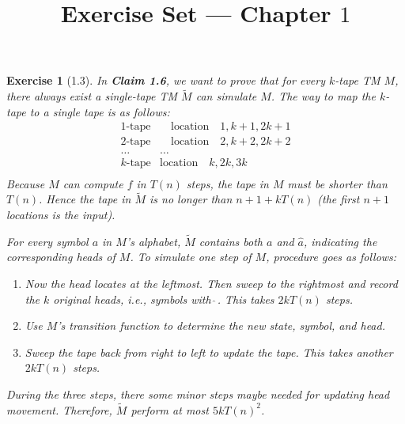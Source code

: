 \documentclass[a4paper]{article}
\title{Exercise Set --- Chapter $1$}
\date{}
\newtheorem*{exercise}{Exercise}
\begin{document}
\maketitle

\begin{exercise}[1.3]
	In \textbf{Claim 1.6}, we want to prove that for every $k$-tape TM $M$,
    there always exist a single-tape TM $\widetilde{M}$ can simulate $M$.
    The way to map the $k$-tape to a single tape is as follows:
		$$
        \begin{matrix}		
            1\text{-tape}&\quad \text{location}\quad 1, k+1, 2k+1\\			
             2\text{-tape}&\quad \text{location}\quad 2, k+2, 2k+2\\			
			 \dots&\dots\\			
             k\text{-tape}&\text{location}\quad k, 2k, 3k\\			
		\end{matrix}
        $$
	Because $M$ can compute $f$ in $T(n)$ steps, the tape in $M$ must be shorter than $T(n)$.
    Hence the tape in $\widetilde{M}$ is no longer than $n+1+kT(n)$ (the first $n+1$ locations is the input).

	For every symbol $a$ in $M$'s alphabet, $\widetilde{M}$ contains both $a$ and $\widehat{a}$, 
    indicating the corresponding heads of $M$. 
	To simulate one step of $M$, procedure goes as follows:
    \begin{enumerate}
        \item Now the head locates at the leftmost.
            Then sweep to the rightmost and record the $k$ original heads, i.e., symbols with $\widehat{\ }$. 
            This takes $2kT(n)$ steps.
        \item Use $M$'s transition function to determine the new state, symbol, and head.
        \item Sweep the tape back from right to left to update the tape. 
            This takes another $2kT(n)$ steps.
    \end{enumerate}
	During the three steps, there some minor steps maybe needed for updating head movement. 
	Therefore, $\widetilde{M}$ perform at most $5kT(n)^2$. 
\end{exercise}
\end{document}
